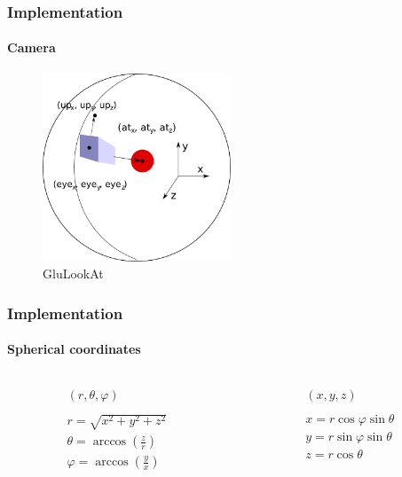 \begin{frame}
    \frametitle{Implementation}
    \framesubtitle{Camera}
    \begin{figure}
        \begin{center}
           \includegraphics[width=0.5\textwidth]{img/camera} 
        \end{center}
        \caption{GluLookAt}
    \end{figure}
\end{frame}

\begin{frame}
    \frametitle{Implementation}
    \framesubtitle{Spherical coordinates}
    \begin{columns}
        \begin{column}{0.5\textwidth}
            \begin{eqnarray}
                (r, \theta, \varphi) \nonumber \\ \nonumber \\
                r = \sqrt{x^{2} + y^{2} + z^{2}} \nonumber\\
                \theta  = \arccos \left( \frac{z}{r}\right) \nonumber \\
                \varphi = \arccos \left( \frac{y}{x}\right) \nonumber
            \end{eqnarray}
        \end{column}
        \begin{column}{0.5\textwidth}
            \begin{eqnarray}
                (x, y, z) \nonumber \\ \nonumber \\
                x = r \cos{\varphi} \sin{\theta} \nonumber \\
                y = r \sin{\varphi} \sin{\theta} \nonumber \\
                z = r \cos{\theta}  \nonumber
            \end{eqnarray}
        \end{column}
    \end{columns}
\end{frame}
